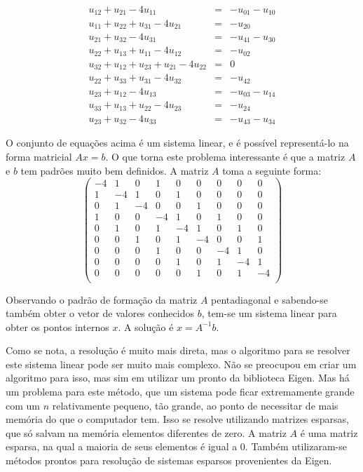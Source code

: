 \documentclass[journal]{IEEEtran}
\begin{document}
\begin{eqnarray}
u_{12}+u_{21} -4u_{11}& = & -u_{01}-u_{10} \nonumber \\
u_{11}+u_{22}+u_{31}-4u_{21}& =& -u_{20} \nonumber \\
u_{21}+u_{32}-4u_{31}&=&-u_{41}-u_{30} \nonumber \\
u_{22}+u_{13}+u_{11}-4u_{12}&=&-u_{02} \nonumber \\
u_{32}+u_{12}+u_{23}+u_{21}-4u_{22}&=&0 \nonumber \\
u_{22}+u_{33}+u_{31}-4u_{32}&=&-u_{42} \nonumber \\
u_{23}+u_{12}-4u_{13}&=&-u_{03}-u_{14} \nonumber \\
u_{33}+u_{13}+u_{22}-4u_{23}&=&-u_{24} \nonumber \\
u_{23}+u_{32}-4u_{33}&=&-u_{43}-u_{34} \nonumber
\end{eqnarray}

O conjunto de equações acima é um sistema linear, e é possível representá-lo na forma matricial $Ax = b$. O que torna este problema interessante é que a matriz $A$ e $b$ tem padrões muito bem definidos. A matriz $A$ toma a seguinte forma:
\[ \left( \begin{array}{ccccccccc}
-4 & 1 & 0 & 1 & 0 & 0 & 0 & 0 & 0 \\ %
1 & -4 & 1 & 0 & 1 & 0 & 0 & 0 & 0 \\ %
0 & 1 & -4 & 0 & 0 & 1 & 0 & 0 & 0 \\ %
1 & 0 & 0 & -4 & 1 & 0 & 1 & 0 & 0 \\ %
0 & 1 & 0 & 1 & -4 & 1 & 0 & 1 & 0 \\ %
0 & 0 & 1 & 0 & 1 & -4 & 0 & 0 & 1 \\ %
0 & 0 & 0 & 1 & 0 & 0 & -4 & 1 & 0 \\ %
0 & 0 & 0 & 0 & 1 & 0 & 1 & -4 & 1 \\ %
0 & 0 & 0 & 0 & 0 & 1 & 0 & 1 & -4 \\ %
\end{array} \right)\]

Observando o padrão de formação da matriz $A$ pentadiagonal e sabendo-se também obter o vetor de valores conhecidos $b$, tem-se um sistema linear para obter os pontos internos $x$. A solução é $x=A^{-1}b$.

Como se nota, a resolução é muito mais direta, mas o algoritmo para se resolver este sistema linear pode ser muito mais complexo. Não se preocupou em criar um algoritmo para isso, mas sim em utilizar um pronto da biblioteca Eigen. Mas há um problema para este método, que um sistema pode ficar extremamente grande com um $n$ relativamente pequeno, tão grande, ao ponto de necessitar de mais memória do que o computador tem. Isso se resolve utilizando matrizes esparsas, que só salvam na memória elementos diferentes de zero. A matriz $A$ é uma matriz esparsa, na qual a maioria de seus elementos é igual a 0. Também utilizaram-se métodos prontos para resolução de sistemas esparsos provenientes da Eigen.
\end{document}
